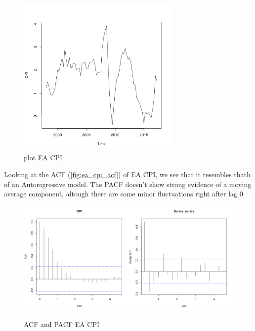 \documentclass[10pt]{article}
\begin{document}
\begin{figure}[h!]
\centering
\includegraphics[width = 0.7\textwidth]{../plots/ea_CPI}
\caption{plot EA CPI}
\label{fig:ea_cpi}
\end{figure}

Looking at the ACF (\autoref{fig:ea_cpi_acf}) of EA CPI, we see that it resembles thath of an Autoregressive model. The PACF doesn't show strong evidence of a moving average component, altough there are some minor fluctuations right after lag 0.

\begin{figure}[h!]
\centering
\includegraphics[width = 0.5\textwidth]{../acf/ea_CPI}\includegraphics[width = 0.5\textwidth]{../pacf/ea_CPI}
\caption{ACF and PACF EA CPI}
\label{fig:ea_cpi_acf}
\end{figure}
\end{document}
